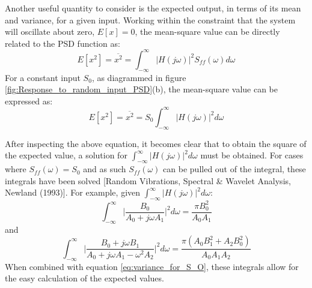 \documentclass[12pt,letter]{article}
\begin{document}
Another useful quantity to consider is the expected output, in terms of its mean and variance, for a given input. Working within the constraint that the system will oscillate about zero, $E[x]=0$, the mean-square value can be directly related to the PSD function as:
\begin{equation}
E[x^2] = \overline{x^2} =   \int_{-\infty}^{\infty} |H(j\omega)|^2 S_{ff}(\omega) d\omega
\end{equation}
For a constant input $S_0$, as diagrammed in figure \ref{fig:Response_to_random_input_PSD}(b), the mean-square value can be expressed as:
\begin{equation}
E[x^2] = \overline{x^2} =   S_{0} \int_{-\infty}^{\infty} |H(j\omega)|^2 d\omega
\label{eq:variance_for_S_O}
\end{equation}

After inspecting the above equation, it becomes clear that to obtain the square of the expected value, a solution for  $\int_{-\infty}^{\infty} |H(j\omega)|^2 d\omega$ must be obtained. For cases where $S_{ff}(\omega) = S_0$ and as such $S_{ff}(\omega)$ can be pulled out of the integral, these integrals have been solved [Random Vibrations, Spectral \& Wavelet Analysis, Newland (1993)]. For example, given $\int_{-\infty}^{\infty} |H(j\omega)|^2 d\omega$:
\begin{equation}
\int_{-\infty}^{\infty} \bigg|\frac{B_0}{A_0+j \omega A_1} \bigg|^2 d\omega = \frac{\pi B_0^2}{A_0 A_1}
\end{equation} 
and
\begin{equation}
\int_{-\infty}^{\infty} \bigg|\frac{B_0 + j \omega B_1}{A_0+j \omega A_1 - \omega^2 A_2} \bigg|^2 d\omega = \frac{\pi (A_0 B_1^2 + A_2 B_0^2)}{A_0 A_1 A_2}
\end{equation} 
When combined with equation \ref{eq:variance_for_S_O}, these integrals allow for the easy calculation of the expected values. 
\end{document}
